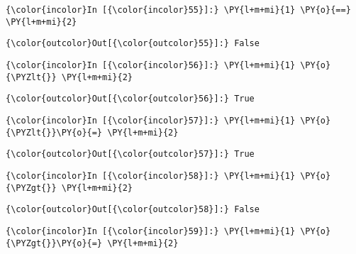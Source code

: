 \begin{Verbatim}[commandchars=\\\{\}]
{\color{incolor}In [{\color{incolor}55}]:} \PY{l+m+mi}{1} \PY{o}{==} \PY{l+m+mi}{2}
\end{Verbatim}


\begin{Verbatim}[commandchars=\\\{\}]
{\color{outcolor}Out[{\color{outcolor}55}]:} False
\end{Verbatim}
            
\begin{Verbatim}[commandchars=\\\{\}]
{\color{incolor}In [{\color{incolor}56}]:} \PY{l+m+mi}{1} \PY{o}{\PYZlt{}} \PY{l+m+mi}{2}
\end{Verbatim}


\begin{Verbatim}[commandchars=\\\{\}]
{\color{outcolor}Out[{\color{outcolor}56}]:} True
\end{Verbatim}
            
\begin{Verbatim}[commandchars=\\\{\}]
{\color{incolor}In [{\color{incolor}57}]:} \PY{l+m+mi}{1} \PY{o}{\PYZlt{}}\PY{o}{=} \PY{l+m+mi}{2}
\end{Verbatim}


\begin{Verbatim}[commandchars=\\\{\}]
{\color{outcolor}Out[{\color{outcolor}57}]:} True
\end{Verbatim}
            
\begin{Verbatim}[commandchars=\\\{\}]
{\color{incolor}In [{\color{incolor}58}]:} \PY{l+m+mi}{1} \PY{o}{\PYZgt{}} \PY{l+m+mi}{2}
\end{Verbatim}


\begin{Verbatim}[commandchars=\\\{\}]
{\color{outcolor}Out[{\color{outcolor}58}]:} False
\end{Verbatim}
            
\begin{Verbatim}[commandchars=\\\{\}]
{\color{incolor}In [{\color{incolor}59}]:} \PY{l+m+mi}{1} \PY{o}{\PYZgt{}}\PY{o}{=} \PY{l+m+mi}{2}
\end{Verbatim}



